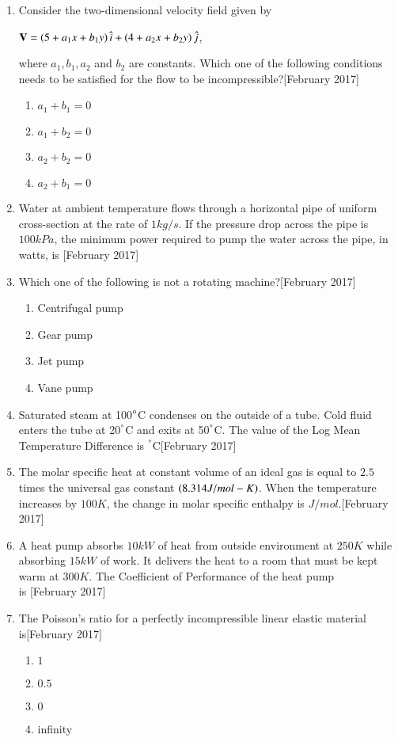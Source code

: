 \documentclass[journal]{IEEEtran}
\begin{document}
\begin{enumerate}
\item Consider the two-dimensional velocity field given by 
\begin{center}
$\mathbf{V} = \left(5 + a_1 x + b_1 y\right) \hat{i} + \left(4 + a_2 x + b_2 y\right) \hat{j}$,
\end{center}where $ a_1, b_1, a_2 $ and  $b_2$ are constants. Which one of the following conditions needs to be satisfied for the flow to be incompressible?\hfill[February 2017]
\begin{enumerate}
    \item $a_1 + b_1 = 0$
    \item $a_1 + b_2 = 0$
    \item $a_2 + b_2 = 0$
    \item $a_2 + b_1 = 0$
\end{enumerate}
\item Water  at ambient temperature flows through a horizontal pipe of uniform cross-section at the rate of $1 kg/s$. If the pressure drop across the pipe is $100 kPa$, the minimum power required to pump the water across the pipe, in watts, is\underline{\hspace{2cm}} \hfill[February 2017]
\item Which one of the following is not a rotating machine?\hfill[February 2017]
\begin{enumerate}
    \item Centrifugal pump
    \item Gear pump
    \item Jet pump
    \item Vane pump
\end{enumerate}
\item Saturated steam at 100$\degree$C condenses on the outside of a tube. Cold fluid enters the tube at 20$^\degree$C and exits at 50$^\degree$C. The value of the Log Mean Temperature Difference  is\underline{\hspace{2cm}} $^\degree$C\hfill[February 2017]
\item The molar specific heat at constant volume of an ideal gas is equal to $2.5$ times the universal gas constant $\left(8.314 J/mol-K\right)$. When the temperature increases by $100 K$, the change in molar specific enthalpy is \underline{\hspace{2cm}} $J/mol$.\hfill[February 2017]
\item A heat pump absorbs $10 kW$ of heat from outside environment at $250 K$ while absorbing $15 kW$ of work. It delivers the heat to a room that must be kept warm at $300 K$. The Coefficient of Performance   of the heat pump \\is \underline{\hspace{2cm}}\hfill[February 2017]
\item The Poisson's ratio for a perfectly incompressible linear elastic material \\is\hfill[February 2017]
\begin{enumerate}
    \item $1$
    \item $0.5$
    \item $0$
    \item infinity
\end{enumerate}
\end{enumerate}
\end{document}
